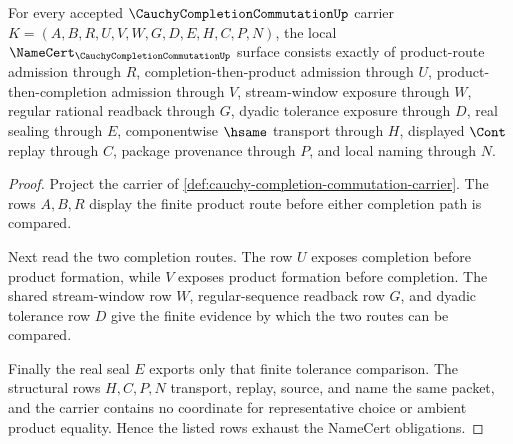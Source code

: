 \begin{theorem}
\label{thm:cauchy-completion-commutation-namecert-obligations}
For every accepted $\CauchyCompletionCommutationUp$ carrier $K=(A,B,R,U,V,W,G,D,E,H,C,P,N)$, the local $\NameCert_{\CauchyCompletionCommutationUp}$ surface consists exactly of product-route admission through $R$, completion-then-product admission through $U$, product-then-completion admission through $V$, stream-window exposure through $W$, regular rational readback through $G$, dyadic tolerance exposure through $D$, real sealing through $E$, componentwise $\hsame$ transport through $H$, displayed $\Cont$ replay through $C$, package provenance through $P$, and local naming through $N$.
\end{theorem}
\begin{proof}
Project the carrier of \autoref{def:cauchy-completion-commutation-carrier}. The rows $A,B,R$ display the finite product route before either completion path is compared.

Next read the two completion routes. The row $U$ exposes completion before product formation, while $V$ exposes product formation before completion. The shared stream-window row $W$, regular-sequence readback row $G$, and dyadic tolerance row $D$ give the finite evidence by which the two routes can be compared.

Finally the real seal $E$ exports only that finite tolerance comparison. The structural rows $H,C,P,N$ transport, replay, source, and name the same packet, and the carrier contains no coordinate for representative choice or ambient product equality. Hence the listed rows exhaust the NameCert obligations.
\end{proof}

